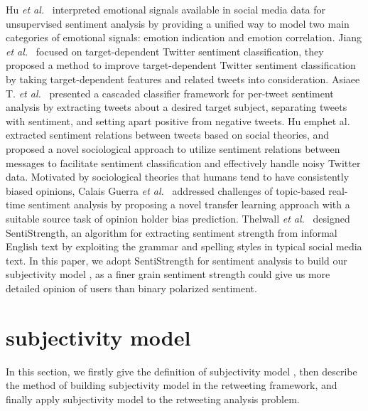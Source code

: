 \documentclass[smallcondensed]{svjour3}     %
\begin{document}
Hu \emph{et al.}~\cite{Hu:2013www} interpreted emotional signals available in social media data for unsupervised sentiment analysis by providing a unified way to model two main categories of emotional signals: emotion indication and emotion correlation. 
Jiang \emph{et al.}~\cite{Jiang:2011TTS} focused on target-dependent Twitter sentiment classification, they proposed a method to improve target-dependent Twitter sentiment classification by taking target-dependent features and related tweets into consideration. 
Asiaee T. \emph{et al.}~\cite{AsiaeeT:2012} presented a cascaded classifier framework for per-tweet sentiment analysis by extracting tweets about a desired target subject, separating tweets with sentiment, and setting apart positive from negative tweets.
Hu emph{et al.}~\cite{Hu:2013ESR} extracted sentiment relations between tweets based on social theories, and proposed a novel sociological approach to utilize sentiment relations between messages to facilitate sentiment classification and effectively handle noisy Twitter data.
Motivated by sociological theories that humans tend to have consistently biased opinions, Calais Guerra \emph{et al.}~\cite{CalaisGuerra:2011BOT} addressed challenges of topic-based real-time sentiment analysis by proposing a novel transfer learning approach with a suitable source task of opinion holder bias prediction.
Thelwall \emph{et al.}~\cite{Thelwall:2010SSS,Thelwall:2012SSD} designed SentiStrength, an algorithm for extracting sentiment strength from informal English text by exploiting the grammar and spelling styles in typical social media text.
In this paper, we adopt SentiStrength for sentiment analysis to build our subjectivity model , as a finer grain sentiment strength could give us more detailed opinion of users than binary polarized sentiment.

\section{subjectivity model }
\label{subjectivemodel}
In this section, we firstly give the definition of subjectivity model , then describe the method of building subjectivity model  in the retweeting framework, and finally apply subjectivity model  to the retweeting analysis problem.
\end{document}
